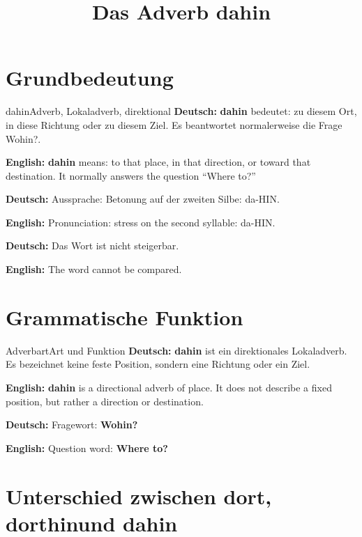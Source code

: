 \documentclass[a4paper,11pt]{article}
\title{Das Adverb \glqq dahin\grqq}
\date{}
\newcommand{\GermanText}[1]{\textbf{Deutsch: }#1\par}
\newcommand{\EnglishText}[1]{{\small\color{SoftGray}\textbf{English: }#1\par}}
\begin{document}
    \maketitle
    \tableofcontents
    \newpage
    
    
    \section{Grundbedeutung}
        
        \begin{grammarentry}{dahin}{Adverb, Lokaladverb, direktional}
            \GermanText{\textbf{dahin} bedeutet: zu diesem Ort, in diese Richtung oder zu diesem Ziel. Es beantwortet normalerweise die Frage \glqq Wohin?\grqq.}
            \EnglishText{\textbf{dahin} means: to that place, in that direction, or toward that destination. It normally answers the question ``Where to?''}
            
            \GermanText{Aussprache: Betonung auf der zweiten Silbe: da-HIN.}
            \EnglishText{Pronunciation: stress on the second syllable: da-HIN.}
            
            \GermanText{Das Wort ist nicht steigerbar.}
            \EnglishText{The word cannot be compared.}
        \end{grammarentry}
    
    
    \section{Grammatische Funktion}
        
        \begin{grammarentry}{Adverbart}{Art und Funktion}
            \GermanText{\textbf{dahin} ist ein direktionales Lokaladverb. Es bezeichnet keine feste Position, sondern eine Richtung oder ein Ziel.}
            \EnglishText{\textbf{dahin} is a directional adverb of place. It does not describe a fixed position, but rather a direction or destination.}
            
            \GermanText{Fragewort: \textbf{Wohin?}}
            \EnglishText{Question word: \textbf{Where to?}}
        \end{grammarentry}
    
    
    \section{Unterschied zwischen \glqq dort\grqq, \glqq dorthin\grqq und \glqq dahin\grqq}
        
\end{document}
